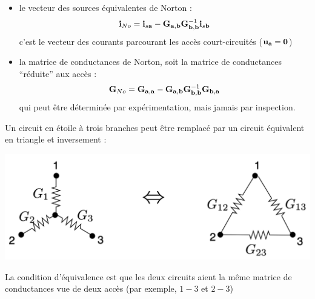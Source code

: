 \begin{itemize}
\item le vecteur des sources équivalentes de Norton :
\[{\bf i}_{No}={\bf i}_{s{\bf a}}-{\bf G}_{\bf a,b}{\bf G}_{\bf b,b}^{-1}{\bf
	i}_{s{\bf b}}\]
c'est le vecteur des courants parcourant les  accès court-circuités (${\bf u}_{\bf a}={\bf 0}$)
\item la matrice de conductances  de Norton, soit la 
matrice de conductances ``réduite'' aux accès :
\[{\bf G}_{No}={\bf G}_{\bf a,a}-{\bf G}_{\bf a,b}{\bf G}_{\bf b,b}^{-1}{\bf
	G}_{\bf b,a}\]
qui peut être déterminée par expérimentation, mais jamais par inspection.
\end{itemize}

\begin{testexample}
Un circuit en étoile à trois branches peut être remplacé par un
circuit équivalent en triangle et inversement :
\begin{center}
\includegraphics[width=0.9\linewidth]{figs/methodes-generales/e2t_3}
\end{center}
La condition d'équivalence est que les deux circuits aient la même matrice de conductances vue de deux accès (par exemple, $1-3$ et $2-3$)


\end{testexample}
